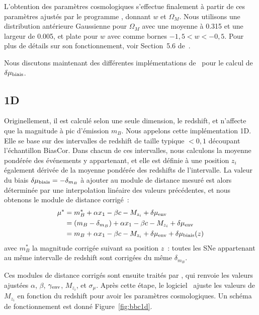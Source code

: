 \documentclass[../main/main.tex]{subfiles}
\begin{document}
L'obtention des paramètres cosmologiques s'effectue finalement à partir de ces
paramètres ajustés par le programme \wfit, donnant $w$ et $\Omega_M$. Nous
utilisons une distribution antérieure Gaussienne pour $\Omega_M$ avec une
moyenne à \num{0.315} et une largeur de \num{0.005}, et plate pour $w$ avec
comme bornes $-1,5 < w < -0,5$. Pour plus de détails sur son fonctionnement,
voir Section~5.6 de~\cite{kessler2017}.

Nous discutons maintenant des différentes implémentations de \bbc\ pour le
calcul de $\delta\mu_{\rm biais}$.

\subsection{\bbc1D}\label{ssec:bbc1D}

Originellement, il est calculé selon une seule dimension, le redshift, et
n'affecte que la magnitude à pic d'émission $m_B$. Nous appelons cette
implémentation \bbc1D. Elle se base sur des intervalles de redshift de taille
typique $< 0,1$ découpant l'échantillon BiasCor. Dans chacun de ces intervalles,
nous calculons la moyenne pondérée des événements y appartenant, et elle est
définie à une position $z_i$ également dérivée de la moyenne pondérée des
redshifts de l'intervalle. La valeur du biais $\delta\mu_{\rm biais} = -
\delta_{m_B}$ à ajouter au module de distance mesuré est alors déterminée par
une interpolation linéaire des valeurs précédentes, et nous obtenons le module
de distance corrigé~:
\begin{align}\label{eq:mu1D}
    \mu^* & = m_B^* + \alpha x_1 - \beta c - M_{z_i}
            + \delta\mu_{\rm env} \nonumber\\
          & = (m_B-\delta_{m_B}) + \alpha x_1 - \beta c - M_{z_i}
            + \delta\mu_{\rm env} \nonumber\\
          & = m_B + \alpha x_1 - \beta c - M_{z_i}
            + \delta\mu_{\rm env} + \delta\mu_{\rm biais}(z)
\end{align}
avec $m_B^*$ la magnitude corrigée suivant sa position $z$~: toutes les SNe
appartenant au même intervalle de redshift sont corrigées du même
$\delta_{m_B}$.

Ces modules de distance corrigés sont ensuite traités par \saltmu, qui renvoie
les valeurs ajustées $\alpha$, $\beta$, $\gamma_{\rm env}$, $M_{z_i}$, et
$\sigma_{\mu}$. Après cette étape, le logiciel \wfit\ ajuste les valeurs de
$M_{z_i}$ en fonction du redshift pour avoir les paramètres cosmologiques. Un
schéma de fonctionnement est donné Figure~\ref{fig:bbc1d}.
\end{document}
